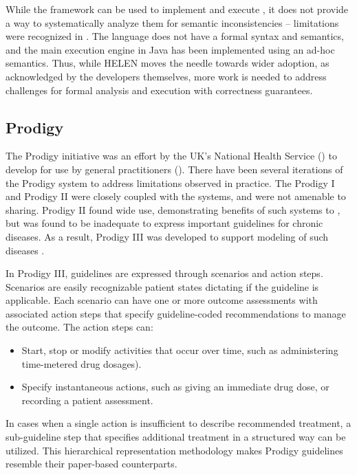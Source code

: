 While the framework can be used to implement and execute \BPGs{}, it does not
provide a way to systematically analyze them for semantic inconsistencies --
limitations were recognized in \cite{SkonetzkiMIM04}. The language does not
have a formal syntax and semantics, and the main execution engine in Java
has been implemented using an ad-hoc semantics. Thus, while HELEN moves the
needle towards wider \BPG{} adoption, as acknowledged by the developers themselves,
more work is needed to address challenges for formal analysis and execution with
correctness guarantees.

\subsection{Prodigy}\label{sec:prodigy}

The Prodigy initiative was an effort by the UK's National Health Service
(\NHS{}) to develop \CDSSs{} for use by general practitioners (\GPs{}). There have
been several iterations of the Prodigy system to address limitations
observed in practice. The Prodigy I and Prodigy II were closely coupled with
the \EHR{} systems, and were not amenable to sharing. Prodigy II found wide
use, demonstrating benefits of such systems to \GPs{}, but was found to be
inadequate to express important guidelines for chronic diseases. As a result,
Prodigy III was developed to support modeling of such diseases \cite{JohnsonAMIA00}.

In Prodigy III, guidelines are expressed through scenarios and action steps.
Scenarios are easily recognizable patient states dictating if the guideline
is applicable. Each scenario can have one or more outcome assessments with
associated action steps that specify guideline-coded recommendations to manage
the outcome. The action steps can:
\begin{itemize}
  \item Start, stop or modify activities that occur over time, such as
    administering time-metered drug dosages).
  \item Specify instantaneous actions, such as giving an immediate drug dose,
    or recording a patient assessment.
\end{itemize}
In cases when a single action is insufficient to describe recommended treatment,
a sub-guideline step that specifies additional treatment in a structured way
can be utilized. This hierarchical representation methodology makes Prodigy
guidelines resemble their paper-based counterparts.

